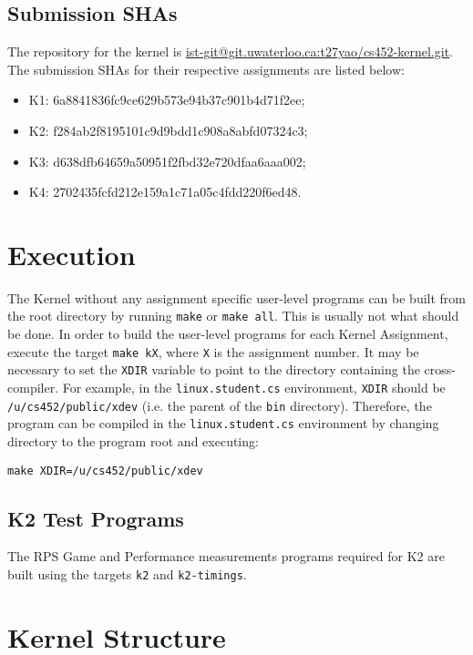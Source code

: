 \documentclass[12pt, titlepage]{article}
\begin{document}
    \subsection{Submission SHAs}

    The repository for the kernel is \href{https://git.uwaterloo.ca/t27yao/cs452-kernel}{ist-git@git.uwaterloo.ca:t27yao/cs452-kernel.git}. The submission SHAs for their respective assignments are listed below:
    \begin{itemize}
        \item K1: 6a8841836fc9ce629b573e94b37c901b4d71f2ee;
        \item K2: f284ab2f8195101c9d9bdd1c908a8abfd07324c3;
        \item K3: d638dfb64659a50951f2fbd32e720dfaa6aaa002;
        \item K4: 2702435fcfd212e159a1c71a05c4fdd220f6ed48.
    \end{itemize}

    \section{Execution}
    
    The Kernel without any assignment specific user-level programs can be built from the root directory by running \verb`make` or \verb`make all`. This is usually not what should be done. In order to build the user-level programs for each Kernel Assignment, execute the target \verb`make kX`, where \verb`X` is the assignment number. It may be necessary to set the \verb`XDIR` variable to point to the directory containing the cross-compiler. For example, in the \verb`linux.student.cs` environment, \verb`XDIR` should be \verb`/u/cs452/public/xdev` (i.e. the parent of the \verb`bin` directory). Therefore, the program can be compiled in the \verb`linux.student.cs` environment by changing directory to the program root and executing:
    \begin{verbatim}
make XDIR=/u/cs452/public/xdev
    \end{verbatim}

    \subsection{K2 Test Programs}
    The RPS Game and Performance measurements programs required for K2 are built using the targets \verb`k2` and \verb`k2-timings`.

    \section{Kernel Structure}
\end{document}
